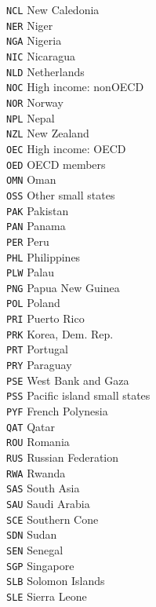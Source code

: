 \begin{multicols}{3}
{\texttt{NCL}	New Caledonia\\
\texttt{NER}	Niger\\
\texttt{NGA}	Nigeria\\
\texttt{NIC}	Nicaragua\\
\texttt{NLD}	Netherlands\\
\texttt{NOC}	High income: nonOECD\\
\texttt{NOR}	Norway\\
\texttt{NPL}	Nepal\\
\texttt{NZL}	New Zealand\\
\texttt{OEC}	High income: OECD\\
\texttt{OED}	OECD members\\
\texttt{OMN}	Oman\\
\texttt{OSS}	Other small states\\
\texttt{PAK}	Pakistan\\
\texttt{PAN}	Panama\\
\texttt{PER}	Peru\\
\texttt{PHL}	Philippines\\
\texttt{PLW}	Palau\\
\texttt{PNG}	Papua New Guinea\\
\texttt{POL}	Poland\\
\texttt{PRI}	Puerto Rico\\
\texttt{PRK}	Korea, Dem. Rep.\\
\texttt{PRT}	Portugal\\
\texttt{PRY}	Paraguay\\
\texttt{PSE}	West Bank and Gaza\\
\texttt{PSS}	Pacific island small states\\
\texttt{PYF}	French Polynesia\\
\texttt{QAT}	Qatar\\
\texttt{ROU}	Romania\\
\texttt{RUS}	Russian Federation\\
\texttt{RWA}	Rwanda\\
\texttt{SAS}	South Asia\\
\texttt{SAU}	Saudi Arabia\\
\texttt{SCE}	Southern Cone\\
\texttt{SDN}	Sudan\\
\texttt{SEN}	Senegal\\
\texttt{SGP}	Singapore\\
\texttt{SLB}	Solomon Islands\\
\texttt{SLE}	Sierra Leone\\
}
\end{multicols}
